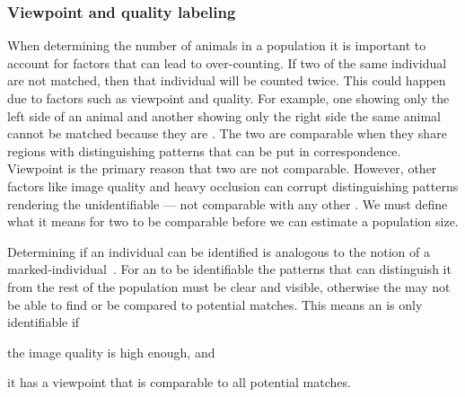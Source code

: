             \DetectFigure{}

        \subsubsection{Viewpoint and quality labeling}\label{sub:viewqual}
            When determining the number of animals in a population it is important to account for factors that can lead
            to over-counting. If two \annots{} of the same individual are not matched, then that individual will be
            counted twice. This could happen due to factors such as viewpoint and quality. For example, one \annot{}
            showing only the left side of an animal and another \annot{} showing only the right side the same animal
            cannot be matched because they are . The two \annots{} are comparable when they
            share regions with distinguishing patterns that can be put in correspondence. Viewpoint is the primary
            reason that two \annots{} are not comparable. However, other factors like image quality and heavy occlusion
            can corrupt distinguishing patterns rendering the \annot{} unidentifiable --- not comparable with any other
            \annot{}. We must define what it means for two \annots{} to be comparable before we can estimate a
            population size.

            Determining if an individual can be identified is analogous to the
            notion of a marked-individual~\cite{seber_estimation_1982}. For an
            \annot{} to be identifiable the patterns that can distinguish it
            from the rest of the population must be clear and visible, otherwise
            the \annot{} may not be able to find or be compared to potential
            matches. This means an \annot{} is only identifiable if
            \begin{enumin}
                \item the image quality is high enough, and %
                \item it has a viewpoint that is comparable to all potential
                matches. %
            \end{enumin}
            
